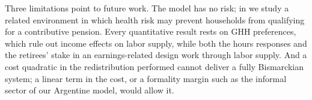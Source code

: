 Three limitations point to future work. The model has no risk; in \textcite{BergGEwp} we study a related environment in which health risk may prevent households from qualifying for a contributive pension. Every quantitative result rests on GHH preferences, which rule out income effects on labor supply, while both the hours responses and the retirees' stake in an earnings-related design work through labor supply. And a cost quadratic in the redistribution performed cannot deliver a fully Bismarckian system; a linear term in the cost, or a formality margin such as the informal sector of our Argentine model, would allow it.
